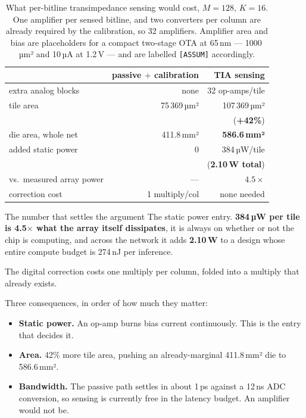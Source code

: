\documentclass[11pt,a4paper]{report}
\begin{document}
\begin{table}[h]
\centering
\caption{What per-bitline transimpedance sensing would cost, $M{=}128$,
$K{=}16$. One amplifier per sensed bitline, and two converters per column are
already required by the calibration, so 32 amplifiers. Amplifier area and bias
are placeholders for a compact two-stage OTA at 65\,nm --- 1000\,µm² and 10\,µA
at 1.2\,V --- and are labelled \texttt{[ASSUM]} accordingly.}
\begin{tabular}{lrr}
\toprule
 & passive $+$ calibration & TIA sensing \\
\midrule
extra analog blocks & none & 32 op-amps/tile \\
tile area & 75\,369\,µm² & 107\,369\,µm² \\
 & & (\textbf{+42\%}) \\
die area, whole net & 411.8\,mm² & \textbf{586.6\,mm²} \\
added static power & 0 & 384\,µW/tile \\
 & & (\textbf{2.10\,W total}) \\
vs.\ measured array power & --- & $\mathbf{4.5\times}$ \\
correction cost & 1 multiply/col & none needed \\
\bottomrule
\end{tabular}
\end{table}

\begin{keybox}{The number that settles the argument}
The static power entry. \textbf{384\,µW per tile is 4.5$\times$ what the array
itself dissipates}, it is always on whether or not the chip is computing, and
across the network it adds \textbf{2.10\,W} to a design whose entire compute
budget is 274\,nJ per inference.

The digital correction costs one multiply per column, folded into a multiply
that already exists.
\end{keybox}

Three consequences, in order of how much they matter:

\begin{itemize}[leftmargin=1.4em]
  \item \textbf{Static power.} An op-amp burns bias current continuously. This
        is the entry that decides it.
  \item \textbf{Area.} 42\% more tile area, pushing an already-marginal
        411.8\,mm² die to 586.6\,mm².
  \item \textbf{Bandwidth.} The passive path settles in about 1\,ps against a
        12\,ns ADC conversion, so sensing is currently free in the latency
        budget. An amplifier would not be.
\end{itemize}
\end{document}

